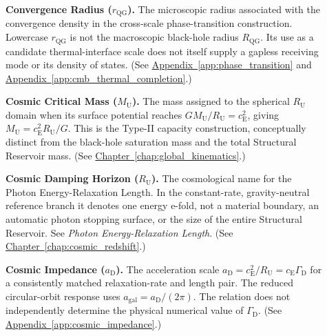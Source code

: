 \begin{description}
\item[] \begin{minipage}[t]{\linewidth}
\textbf{Convergence Radius ($r_{\mathrm{QG}}$).} The microscopic radius associated with the convergence density in the cross-scale phase-transition construction. Lowercase $r_{\mathrm{QG}}$ is not the macroscopic black-hole radius $R_{\mathrm{QG}}$. Its use as a candidate thermal-interface scale does not itself supply a gapless receiving mode or its density of states.
(See \hyperref[app:phase_transition]{Appendix~\ref*{app:phase_transition}} and \hyperref[app:cmb_thermal_completion]{Appendix~\ref*{app:cmb_thermal_completion}}.)
\end{minipage}

\item[] \begin{minipage}[t]{\linewidth}
\textbf{Cosmic Critical Mass ($M_{\mathrm U}$).} The mass assigned to the spherical $R_{\mathrm U}$ domain when its surface potential reaches $GM_{\mathrm U}/R_{\mathrm U}=c_{\mathrm E}^2$, giving $M_{\mathrm U}=c_{\mathrm E}^2R_{\mathrm U}/G$. This is the Type-II capacity construction, conceptually distinct from the black-hole saturation mass and the total Structural Reservoir mass.
(See \hyperref[chap:global_kinematics]{Chapter~\ref*{chap:global_kinematics}}.)
\end{minipage}

\item[] \begin{minipage}[t]{\linewidth}
\textbf{Cosmic Damping Horizon ($R_{\mathrm U}$).} The cosmological name for the Photon Energy-Relaxation Length. In the constant-rate, gravity-neutral reference branch it denotes one energy e-fold, not a material boundary, an automatic photon stopping surface, or the size of the entire Structural Reservoir. See \emph{Photon Energy-Relaxation Length}.
(See \hyperref[chap:cosmic_redshift]{Chapter~\ref*{chap:cosmic_redshift}}.)
\end{minipage}

\item[] \begin{minipage}[t]{\linewidth}
\textbf{Cosmic Impedance ($a_{\mathrm D}$).} The acceleration scale $a_{\mathrm D}=c_{\mathrm E}^2/R_{\mathrm U}=c_{\mathrm E}\Gamma_{\mathrm D}$ for a consistently matched relaxation-rate and length pair. The reduced circular-orbit response uses $a_{\mathrm{gal}}=a_{\mathrm D}/(2\pi)$. The relation does not independently determine the physical numerical value of $\Gamma_{\mathrm D}$.
(See \hyperref[app:cosmic_impedance]{Appendix~\ref*{app:cosmic_impedance}}.)
\end{minipage}


\end{description}
